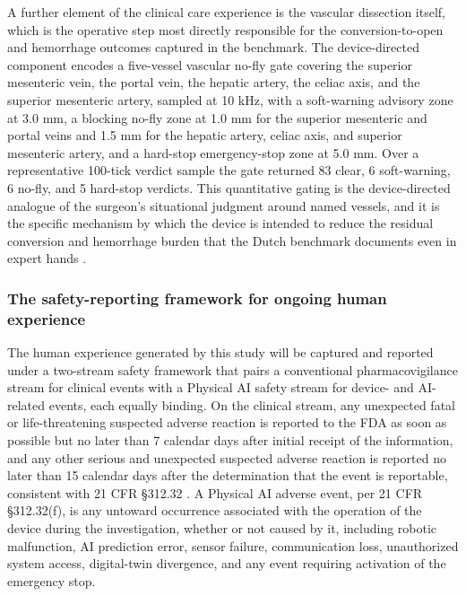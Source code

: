A further element of the clinical care experience is the vascular dissection
itself, which is the operative step most directly responsible for the
conversion-to-open and hemorrhage outcomes captured in the benchmark. The
device-directed component encodes a five-vessel vascular no-fly gate covering the
superior mesenteric vein, the portal vein, the hepatic artery, the celiac axis,
and the superior mesenteric artery, sampled at 10 kHz, with a soft-warning advisory
zone at 3.0 mm, a blocking no-fly zone at 1.0 mm for the superior mesenteric and
portal veins and 1.5 mm for the hepatic artery, celiac axis, and superior
mesenteric artery, and a hard-stop emergency-stop zone at 5.0 mm. Over a
representative 100-tick verdict sample the gate returned 83 clear, 6 soft-warning,
6 no-fly, and 5 hard-stop verdicts. This quantitative gating is the device-directed
analogue of the surgeon's situational judgment around named vessels, and it is the
specific mechanism by which the device is intended to reduce the residual
conversion and hemorrhage burden that the Dutch benchmark documents even in
expert hands \cite{daraxwhipple, onpremwhippl}.

\subsubsection*{The safety-reporting framework for ongoing human experience}

The human experience generated by this study will be captured and reported under a
two-stream safety framework that pairs a conventional pharmacovigilance stream for
clinical events with a Physical AI safety stream for device- and AI-related events,
each equally binding. On the clinical stream, any unexpected fatal or
life-threatening suspected adverse reaction is reported to the FDA as soon as
possible but no later than 7 calendar days after initial receipt of the
information, and any other serious and unexpected suspected adverse reaction is
reported no later than 15 calendar days after the determination that the event is
reportable, consistent with 21 CFR \S 312.32 \cite{cfr312paiuni}. A Physical AI
adverse event, per 21 CFR \S 312.32(f), is any untoward occurrence associated with
the operation of the device during the investigation, whether or not caused by it,
including robotic malfunction, AI prediction error, sensor failure, communication
loss, unauthorized system access, digital-twin divergence, and any event requiring
activation of the emergency stop. 

